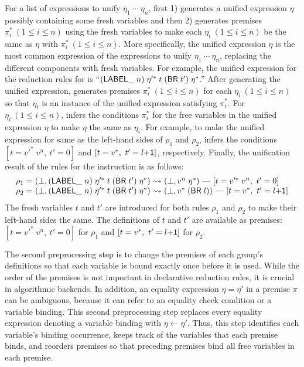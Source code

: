 For a list of expressions to unify $\eta_1\ \cdots\ \eta_n$,
\unify first 1) generates a unified expression $\eta$ possibly containing some fresh variables
and then 2) generates premises $\pi_i^*\ (1\le i \le n)$ using the fresh variables to make
each $\eta_i\ (1\le i \le n)$ be the same as $\eta$ with $\pi_i^*\ (1\le i \le n)$.
More specifically, the unified expression $\eta$ is the most common expression of
the expressions to unify $\eta_1\ \cdots\ \eta_n$,
replacing the different components with fresh variables.
For example, the unified expression for the reduction rules for  is
``{$(\mathsf{LABEL\_} \; n) \; \eta'^*\; t\; (\mathsf{BR}\; t')\; \eta^*$}.''
After generating the unified expression, \unify generates premises $\pi_i^*\ (1\le i \le n)$
for each $\eta_i\ (1\le i \le n)$ so that $\eta_i$ is an instance of the unified expression satisfying $\pi_i^*$.
For $\eta_i\ (1\le i \le n)$, \unify infers the conditions $\pi_i^*$ for the free variables
in the unified expression $\eta$ to make $\eta$ the same as $\eta_i$.
For example, to make the unified expression for 
same as the left-hand sides of $\rho_1$ and $\rho_2$, \unify infers the conditions
$[t = v'^*\; v^n,\ t' = 0]$ and $[t = v^*,\ t' = l\mathsf{+1}]$, respectively.
Finally, the unification result of the rules for the  instruction is as follows:
\[
\begin{array}{l@{~}l@{~}c@{~}l}
\rho_1 = &(\bot, (\ssf{LABEL\_} \; n) \; \eta'^*\; t\; (\ssf{BR}\; t')\; \eta^*) &\leadsto&
 (\bot, v^n\; \eta^*)\ \mbox{---}\ [t = v'^*\; v^n,\ t' = 0]\\
\rho_2 = &(\bot, (\ssf{LABEL\_} \; n) \; \eta'^*\; t\; (\ssf{BR}\; t')\; \eta^*) &\leadsto&
 (\bot, v^*\; (\ssf{BR}\; l))\ \mbox{---}\ [t = v^*,\ t' = l\ssf{+1}]
\end{array}
\]
The fresh variables $t$ and $t'$ are introduced for both rules $\rho_1$ and $\rho_2$
to make their left-hand sides the same. The definitions of $t$ and $t'$ are available as premises:
$[t = v'^*\; v^n,\ t' = 0]$ for $\rho_1$ and
$[t = v^*,\ t' = l\mathsf{+1}]$ for $\rho_2$.


\medskip
The second preprocessing step is to change the premises of each group's definitions
so that each variable is bound exactly once before it is used.
While the order of the premises is not important in declarative reduction rules,
it is crucial in algorithmic backends.
In addition, an equality expression $\eta = \eta'$ in a premise $\pi$ can be ambiguous,
because it can refer to an equality check condition or a variable binding.
This second preprocessing step replaces every equality expression denoting a variable binding with $\eta \leftarrow \eta'$.
Thus, this step identifies each variable's binding occurrence,
keeps track of the variables that each premise binds,
and reorders premises so that preceding premises bind all free variables in each premise.


